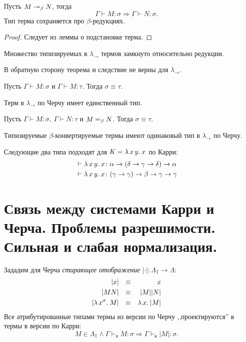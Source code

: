 \documentclass[11pt,a4paper]{article}
\begin{document}
\begin{thm}
    Пусть $ M \twoheadrightarrow_{\beta} N$, тогда 
	\[
	\Gamma \vdash M\colon \sigma  \Longrightarrow \Gamma \vdash N \colon \sigma 
	.\] 
	Тип терма сохраняется про $ \beta $-редукциях.
\end{thm}
\begin{proof}
    Следует из леммы о подстановке терма.
\end{proof}
\begin{cor}
    Множество типизируемых в $ \lambda_{\to}$  термов замкнуто относительно редукции.
\end{cor}
В обратную сторону теорема и следствие не верны для $ \lambda_{\to}$.

\begin{thm}
    Пусть $ \Gamma \vdash M\colon \sigma $ и $ \Gamma \vdash M\colon \tau $. Тогда $ \sigma \equiv \tau $.

	Терм в $ \lambda_{\to}$ по Черчу имеет единственный тип.
\end{thm}
\begin{cor}
    Пусть $ \Gamma \vdash M\colon \sigma, ~ \Gamma \vdash N\colon \tau  $ и $ M =_{\beta} N$. Тогда $ \sigma \equiv \tau $.

	Типизируемые $ \beta $-конвертируемые термы имеют одинаковый тип в $ \lambda_{\to}$ по Черчу.
\end{cor}

\begin{ex}
	Следующие два типа подходят для $ K = \lambda\,{x\,y}.\:{x}$ по Карри:
	 \[
	\begin{aligned}
		&\vdash \lambda\,{x\,y}.\:{x} \colon \alpha \to ( \delta  \to  \gamma \to  \delta ) \to  \alpha \\
		&\vdash \lambda\,{x\,y}.\:{x} \colon ( \gamma \to \gamma ) \to  \beta \to \gamma \to \gamma 
	\end{aligned}
	\]
\end{ex}


\section{Связь между системами Карри и Черча. Проблемы разрешимости. Сильная и слабая нормализация.}
Зададим для Черча \textit{стирающее отображение} $ \lvert \cdot \rvert \colon \Lambda_{\mathbb{T}} \to \Lambda$:
\[
\begin{aligned}
	\lvert x \rvert  && \equiv && x \\
	\lvert MN \rvert  && \equiv && \lvert M \rvert \lvert N \rvert \\
	\lvert \lambda\,{x^{\sigma}}.\:{M} \rvert && \equiv && \lambda\,{x}.\:{\lvert M \rvert }
\end{aligned}
\]
Все атрибутированные типами термы из версии по Черчу ,,проектируются'' в термы в версии по Карри:
\[
	M \in \Lambda_{\mathbb{T}} \wedge \Gamma \vdash_{ч} M\colon \sigma  \Longrightarrow \Gamma \vdash_{к} \lvert M \rvert \colon \sigma 
.\] 
\end{document}
